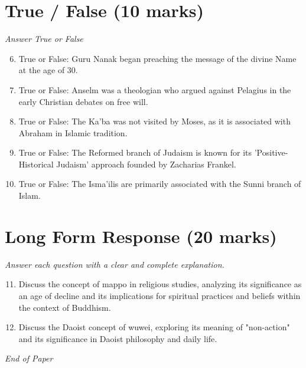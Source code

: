 \documentclass[12pt]{article}
\begin{document}
\section*{True / False (10 marks)}
\textit{Answer True or False}
\begin{enumerate}[label=\arabic*.]
\setcounter{enumi}{5}
\item True or False: Guru Nanak began preaching the message of the divine Name at the age of 30.
\item True or False: Anselm was a theologian who argued against Pelagius in the early Christian debates on free will.
\item True or False: The Ka'ba was not visited by Moses, as it is associated with Abraham in Islamic tradition.
\item True or False: The Reformed branch of Judaism is known for its 'Positive-Historical Judaism' approach founded by Zacharias Frankel.
\item True or False: The Isma'ilis are primarily associated with the Sunni branch of Islam.
\end{enumerate}

\section*{Long Form Response (20 marks)}
\textit{Answer each question with a clear and complete explanation.}
\begin{enumerate}[label=\arabic*.]
\setcounter{enumi}{10}
\item Discuss the concept of mappo in religious studies, analyzing its significance as an age of decline and its implications for spiritual practices and beliefs within the context of Buddhism.
\item Discuss the Daoist concept of wuwei, exploring its meaning of "non-action" and its significance in Daoist philosophy and daily life.
\end{enumerate}

\vfill
\noindent\textit{End of Paper}
\end{document}
